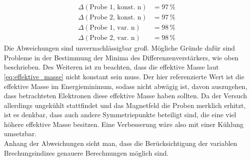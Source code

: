 \begin{align*}
    \Delta(\text{Probe 1, konst. n}) &= 97 \, \% \\
    \Delta(\text{Probe 2, konst. n}) &= 97 \, \% \\
    \Delta(\text{Probe 1, var. n})   &= 98 \, \% \\
    \Delta(\text{Probe 2, var. n})   &= 98 \, \% 
\end{align*}
Die Abweichungen sind unvernachlässigbar groß. Mögliche Gründe dafür sind Probleme in der Bestimmung der Minima des Differenzenverstärkers, wie oben beschrieben.
Des Weiteren ist zu beachten, dass die effektive Masse laut \autoref{eq:effektive_masse} nicht konstant sein muss. Der hier referenzierte Wert
ist die effektive Masse im Energieminimum, sodass nicht abwägig ist, davon auszugehen, dass betrachteten Elektronen diese effektive Masse haben sollten. Da der Versuch allerdings ungekühlt stattfindet und das Magnetfeld
die Proben merklich erhitzt, ist es denkbar, dass auch andere Symmetriepunkte beteiligt sind, die eine viel höhere effektive Masse besitzen. Eine Verbesserung wäre also mit einer Kühlung umsetzbar.\\
Anhang der Abweichungen sieht man, dass die Berücksichtigung der variablen Brechungsindizes genauere Berechnungen möglich sind.

